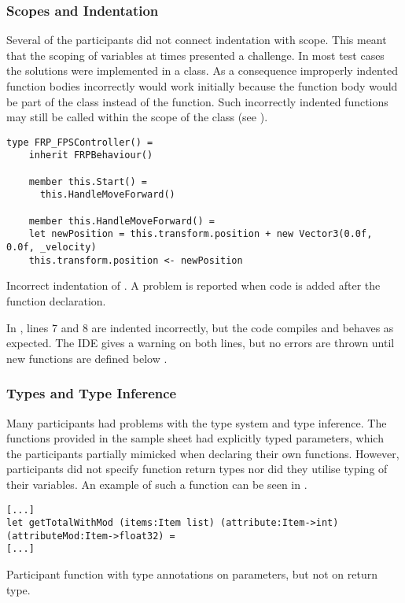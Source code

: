 \subsubsection{Scopes and Indentation}
Several of the participants did not connect indentation with scope. This meant that the scoping of variables at times presented a challenge. In most test cases the solutions were implemented in a class. As a consequence improperly indented function bodies incorrectly would work initially because the function body would be part of the class instead of the function. Such incorrectly indented functions may still be called within the scope of the class (see ).

\begin{listing}[H]
\begin{verbatim}
type FRP_FPSController() =
    inherit FRPBehaviour()

    member this.Start() =
      this.HandleMoveForward()

    member this.HandleMoveForward() =
    let newPosition = this.transform.position + new Vector3(0.0f, 0.0f, _velocity)
    this.transform.position <- newPosition
\end{verbatim}
\caption{Incorrect indentation of . A problem is reported when code is added after the function declaration.}
\label{lst:scope-prob}
\end{listing}

In , lines 7 and 8 are indented incorrectly, but the code compiles and behaves as expected. The \gls{IDE} gives a warning on both lines, but no errors are thrown until new  functions are defined below .

\subsubsection{Types and Type Inference}
Many participants had problems with the type system and type inference. The functions provided in the sample sheet had explicitly typed parameters, which the participants partially mimicked when declaring their own functions. However, participants did not specify function return types nor did they utilise typing of their variables. An example of such a function can be seen in .

\begin{listing}[H]
\begin{verbatim}
[...]
let getTotalWithMod (items:Item list) (attribute:Item->int) (attributeMod:Item->float32) =
[...]
\end{verbatim}
\caption{Participant function with type annotations on parameters, but not on return type.}
\label{lst:part-func}
\end{listing}

